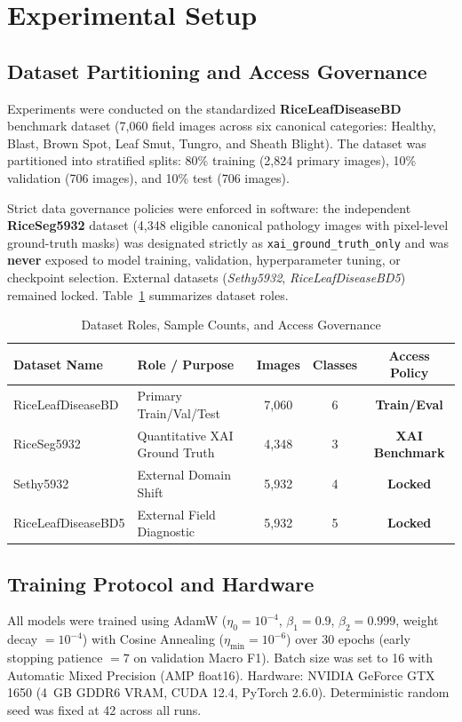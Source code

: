 \documentclass[conference]{IEEEtran}
\begin{document}
\section{Experimental Setup}
\label{sec:experimental_setup}

\subsection{Dataset Partitioning and Access Governance}
Experiments were conducted on the standardized \textbf{RiceLeafDiseaseBD} benchmark dataset (7,060 field images across six canonical categories: Healthy, Blast, Brown Spot, Leaf Smut, Tungro, and Sheath Blight). The dataset was partitioned into stratified splits: 80\% training (2,824 primary images), 10\% validation (706 images), and 10\% test (706 images). 

Strict data governance policies were enforced in software: the independent \textbf{RiceSeg5932} dataset (4,348 eligible canonical pathology images with pixel-level ground-truth masks) was designated strictly as \texttt{xai\_ground\_truth\_only} and was \textbf{never} exposed to model training, validation, hyperparameter tuning, or checkpoint selection. External datasets (\textit{Sethy5932}, \textit{RiceLeafDiseaseBD5}) remained locked. Table~\ref{tab:dataset_summary} summarizes dataset roles.

\begin{table}[htbp]
\centering
\caption{Dataset Roles, Sample Counts, and Access Governance}
\label{tab:dataset_summary}
\scriptsize
\setlength{\tabcolsep}{2.5pt}
\begin{tabular}{llccc}
\toprule
\textbf{Dataset Name} & \textbf{Role / Purpose} & \textbf{Images} & \textbf{Classes} & \textbf{Access Policy} \\
\midrule
RiceLeafDiseaseBD & Primary Train/Val/Test & 7,060 & 6 & \textbf{Train/Eval} \\
RiceSeg5932 & Quantitative XAI Ground Truth & 4,348 & 3 & \textbf{XAI Benchmark} \\
Sethy5932 & External Domain Shift & 5,932 & 4 & \textbf{Locked} \\
RiceLeafDiseaseBD5 & External Field Diagnostic & 5,932 & 5 & \textbf{Locked} \\
\bottomrule
\end{tabular}
\end{table}

\subsection{Training Protocol and Hardware}
All models were trained using AdamW ($\eta_0 = 10^{-4}$, $\beta_1 = 0.9$, $\beta_2 = 0.999$, weight decay $= 10^{-4}$) with Cosine Annealing ($\eta_{\text{min}} = 10^{-6}$) over 30 epochs (early stopping patience $= 7$ on validation Macro F1). Batch size was set to 16 with Automatic Mixed Precision (AMP float16). Hardware: NVIDIA GeForce GTX 1650 (4~GB GDDR6 VRAM, CUDA 12.4, PyTorch 2.6.0). Deterministic random seed was fixed at 42 across all runs.
\end{document}
